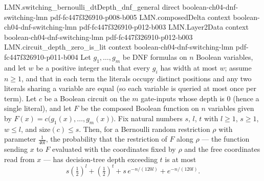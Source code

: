 \begin{lemma}
  {LMN.switching_bernoulli_dtDepth_dnf_general}
  {direct}
  {boolean-ch04-dnf-switching-lmn}
  {pdf-fc447f326910-p008-b005}
\proofstep
  {LMN.composedDelta}
  {context}
  {boolean-ch04-dnf-switching-lmn}
  {pdf-fc447f326910-p012-b003}
\proofstep
  {LMN.Layer2Data}
  {context}
  {boolean-ch04-dnf-switching-lmn}
  {pdf-fc447f326910-p012-b003}
\proofstep
  {LMN.circuit_depth_zero_is_lit}
  {context}
  {boolean-ch04-dnf-switching-lmn}
  {pdf-fc447f326910-p011-b004}
Let $g_1,\dots,g_m$ be DNF formulas on $n$ Boolean variables, and let $w$ be a positive
integer such that every $g_i$ has width at most $w$; assume $n \ge 1$, and that in each
term the literals occupy distinct positions and any two literals sharing a variable are
equal (so each variable is queried at most once per term). Let $c$ be a Boolean circuit
on the $m$ gate-inputs whose depth is $0$ (hence a single literal), and let $F$ be the
composed Boolean function on $n$ variables given by $F(x) =
c\bigl(g_1(x),\dots,g_m(x)\bigr)$. Fix natural numbers $s$, $l$, $t$ with $l \ge 1$, $s
\ge 1$, $w \le l$, and $\mathrm{size}(c) \le s$. Then, for a Bernoulli random
restriction $\rho$ with parameter $\tfrac{1}{40l}$, the probability that the restriction
of $F$ along $\rho$ — the function sending $x$ to $F$ evaluated with the coordinates
fixed by $\rho$ and the free coordinates read from $x$ — has decision-tree depth
exceeding $t$ is at most
\[
s\left(\tfrac12\right)^{l} + \left(\tfrac12\right)^{t} + s\,e^{-n/(120 l)} + e^{-n/(120
l)}.
\]
\end{lemma}

